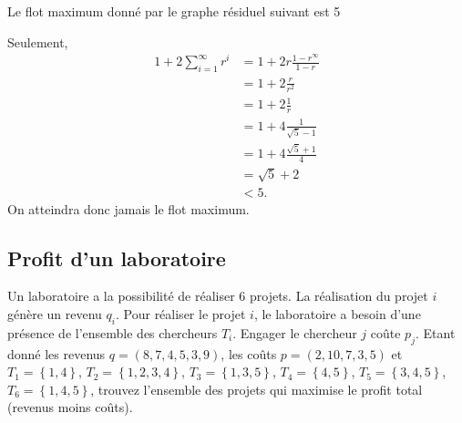 \begin{solution}
\begin{itemize}
      Le flot maximum donné par le graphe résiduel suivant est 5
      \begin{center}
      \end{center}
      Seulement,
      \begin{align*}
        1 + 2\sum_{i=1}^\infty r^i & = 1 + 2r\frac{1-r^\infty}{1-r}\\
                                   & = 1 + 2\frac{r}{r^2}\\
                                   & = 1 + 2\frac{1}{r}\\
                                   & = 1 + 4\frac{1}{\sqrt{5}-1}\\
                                   & = 1 + 4\frac{\sqrt{5}+1}{4}\\
                                   & = \sqrt{5}+2\\
                                   & < 5.
      \end{align*}
      On atteindra donc jamais le flot maximum.
  \end{itemize}
\end{solution}

\subsection{Profit d'un laboratoire}
Un laboratoire a la possibilité de réaliser 6 projets. La réalisation du projet $i$ génère un revenu $q_i$. Pour réaliser le projet $i$, le laboratoire a besoin d'une présence de l'ensemble des chercheurs $T_i$. Engager le chercheur $j$ coûte $p_j$. Etant donné les revenus $q= (8,7,4,5,3,9)$, les coûts $p=(2,10,7,3,5)$ et $T_1 = \left\lbrace 1, 4 \right\rbrace$, $T_2 = \left\lbrace 1,2,3,4 \right\rbrace$, $T_3 = \left\lbrace 1,3,5 \right\rbrace$, $T_4 = \left\lbrace 4,5 \right\rbrace$, $T_5 = \left\lbrace 3,4,5 \right\rbrace$, $T_6 = \left\lbrace 1, 4,5 \right\rbrace$, trouvez l'ensemble des projets qui maximise le profit total (revenus moins coûts).


